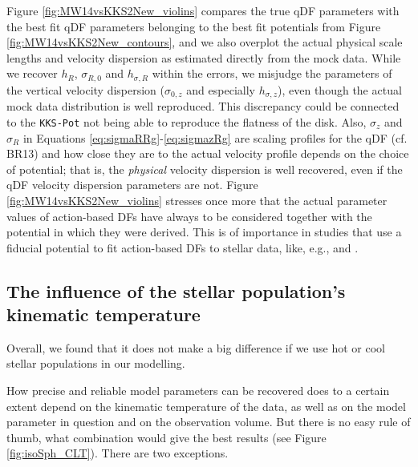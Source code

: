 \documentclass[iop,revtex4,numberedappendix,appendixfloats]{emulateapj}
\begin{document}
Figure \ref{fig:MW14vsKKS2New_violins} compares the true qDF parameters with the best fit qDF parameters belonging to the best fit potentials from Figure \ref{fig:MW14vsKKS2New_contours}, and we also overplot the actual physical scale lengths and velocity dispersion as estimated directly from the mock data. While we recover $h_R$, $\sigma_{R,0}$ and $h_{\sigma,R}$ within the errors, we misjudge the parameters of the vertical velocity dispersion ($\sigma_{0,z}$ and especially $h_{\sigma,z}$), even though the actual mock data distribution is well reproduced. This discrepancy could be connected to the \texttt{KKS-Pot} not being able to reproduce the flatness of the disk. Also, $\sigma_z$ and $\sigma_R$ in Equations \eqref{eq:sigmaRRg}-\eqref{eq:sigmazRg} are scaling profiles for the qDF (cf. BR13) and how close they are to the actual velocity profile depends on the choice of potential; that is, the \emph{physical} velocity dispersion is well recovered, even if the qDF velocity dispersion parameters are not. Figure \ref{fig:MW14vsKKS2New_violins} stresses once more that the actual parameter values of action-based DFs have always to be considered together with the potential in which they were derived. This is of importance in studies that use a fiducial potential to fit action-based DFs to stellar data, like, e.g., \citet{2015MNRAS.449.3479S} and \citet{2016arXiv160309332D}.

\subsection{The influence of the stellar population's kinematic temperature} \label{sec:results_temperature}

Overall, we found that it does not make a big difference if we use hot or cool stellar populations in our modelling.

How precise and reliable model parameters can be recovered does to a certain extent depend on the kinematic temperature of the data, as well as on the model parameter in question and on the observation volume. But there is no easy rule of thumb, what combination would give the best results (see Figure \ref{fig:isoSph_CLT}). There are two exceptions.
\end{document}

